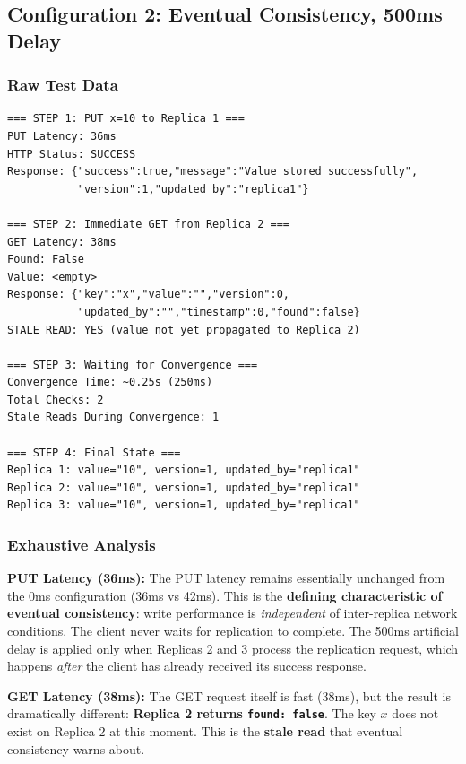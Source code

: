 \documentclass[10pt,a4paper]{article}
\begin{document}
\subsection{Configuration 2: Eventual Consistency, 500ms Delay}

\subsubsection{Raw Test Data}

\begin{verbatim}
=== STEP 1: PUT x=10 to Replica 1 ===
PUT Latency: 36ms
HTTP Status: SUCCESS
Response: {"success":true,"message":"Value stored successfully",
           "version":1,"updated_by":"replica1"}

=== STEP 2: Immediate GET from Replica 2 ===
GET Latency: 38ms
Found: False
Value: <empty>
Response: {"key":"x","value":"","version":0,
           "updated_by":"","timestamp":0,"found":false}
STALE READ: YES (value not yet propagated to Replica 2)

=== STEP 3: Waiting for Convergence ===
Convergence Time: ~0.25s (250ms)
Total Checks: 2
Stale Reads During Convergence: 1

=== STEP 4: Final State ===
Replica 1: value="10", version=1, updated_by="replica1"
Replica 2: value="10", version=1, updated_by="replica1"
Replica 3: value="10", version=1, updated_by="replica1"
\end{verbatim}

\subsubsection{Exhaustive Analysis}

\textbf{PUT Latency (36ms):} The PUT latency remains essentially unchanged from the 0ms configuration (36ms vs 42ms). This is the \textbf{defining characteristic of eventual consistency}: write performance is \textit{independent} of inter-replica network conditions. The client never waits for replication to complete. The 500ms artificial delay is applied only when Replicas 2 and 3 process the replication request, which happens \textit{after} the client has already received its success response.

\textbf{GET Latency (38ms):} The GET request itself is fast (38ms), but the result is dramatically different: \textbf{Replica 2 returns \texttt{found: false}}. The key $x$ does not exist on Replica 2 at this moment. This is the \textbf{stale read} that eventual consistency warns about.
\end{document}
